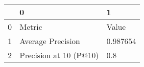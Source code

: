 \begin{tabular}{lll}
\toprule
{} &                       0 &         1 \\
\midrule
0 &                  Metric &     Value \\
1 &       Average Precision &  0.987654 \\
2 &  Precision at 10 (P@10) &       0.8 \\
\bottomrule
\end{tabular}
